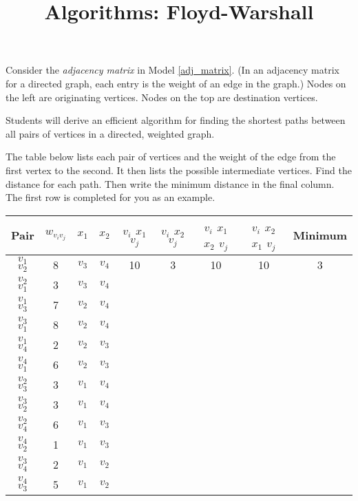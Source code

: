 \documentclass{tufte-handout}
\title{Algorithms: Floyd-Warshall}
\date{}
\begin{document}
\maketitle

\begin{questions}

\item Consider the \emph{adjacency matrix} in Model \ref{adj_matrix}. (In an adjacency matrix for a directed graph, each entry is the weight of an edge in the graph.) Nodes on the left are originating vertices. Nodes on the top are destination vertices.

\begin{objective}
  Students will derive an efficient algorithm for finding the shortest paths between all pairs of vertices in a directed, weighted graph.
\end{objective}

The table below lists each pair of vertices and the weight of the edge from the first vertex to the second. It then lists the possible intermediate vertices. Find the distance for each path. Then write the minimum distance in the final column. The first row is completed for you as an example.\label{by_hand}

\begin{tabular}{|c|c|c|c|c|c|c|c|c|}
\hline
Pair & $w_{v_i v_j}$ & $x_1$ & $x_2$ & $v_i$ $x_1$ $v_j$ & $v_i$ $x_2$ $v_j$ &$v_i$ $x_1$ $x_2$ $v_j$ &$v_i$ $x_2$ $x_1$ $v_j$ & Minimum\\
\hline
$v_1$ $v_2$ & 8 & $v_3$ & $v_4$ & 10 & 3 & 10 & 10 & 3 \\
$v_2$ $v_1$ & 3 & $v_3$ & $v_4$ &  &  &  &  &  \\
$v_1$ $v_3$ & 7 & $v_2$ & $v_4$ &  &  &  &  &  \\ 
$v_3$ $v_1$ & 8 & $v_2$ & $v_4$ &  &  &  &  &  \\ 
$v_1$ $v_4$ & 2 & $v_2$ & $v_3$ &  &  &  &  & \\ 
$v_4$ $v_1$ & 6 & $v_2$ & $v_3$ &  &  &  &  & \\ 
$v_2$ $v_3$ & 3 & $v_1$ & $v_4$ &  &  &  &  & \\ 
$v_3$ $v_2$ & 3 & $v_1$ & $v_4$ &  &  &  &  & \\ 
$v_2$ $v_4$ & 6 & $v_1$ & $v_3$ &  &  &  &  & \\ 
$v_4$ $v_2$ & 1 & $v_1$ & $v_3$ &  &  &  &  & \\
$v_3$ $v_4$ & 2 & $v_1$ & $v_2$ &  &  &  &  & \\
$v_4$ $v_3$ & 5 & $v_1$ & $v_2$ &  &  &  &  & \\
\hline
\end{tabular}


\end{questions}
\end{document}
